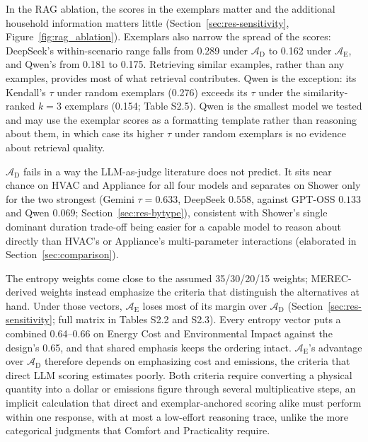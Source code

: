 \documentclass[final,3p,times]{elsarticle}
\begin{document}
In the RAG ablation, the scores in the exemplars matter and the additional household information matters little (Section~\ref{sec:res-sensitivity}, Figure~\ref{fig:rag_ablation}). Exemplars also narrow the spread of the scores: DeepSeek's within-scenario range falls from 0.289 under $\mathcal{A}_{\text{D}}$ to 0.162 under $\mathcal{A}_{\text{E}}$, and Qwen's from 0.181 to 0.175. Retrieving similar examples, rather than any examples, provides most of what retrieval contributes. Qwen is the exception: its Kendall's $\tau$ under random exemplars (0.276) exceeds its $\tau$ under the similarity-ranked $k=3$ exemplars (0.154; Table S2.5). Qwen is the smallest model we tested and may use the exemplar scores as a formatting template rather than reasoning about them, in which case its higher $\tau$ under random exemplars is no evidence about retrieval quality.

$\mathcal{A}_{\text{D}}$ fails in a way the LLM-as-judge literature does not predict. It sits near chance on HVAC and Appliance for all four models and separates on Shower only for the two strongest (Gemini $\tau = 0.633$, DeepSeek $0.558$, against GPT-OSS $0.133$ and Qwen $0.069$; Section~\ref{sec:res-bytype}), consistent with Shower's single dominant duration trade-off being easier for a capable model to reason about directly than HVAC's or Appliance's multi-parameter interactions (elaborated in Section~\ref{sec:comparison}).

The entropy weights come close to the assumed 35/30/20/15 weights; MEREC-derived weights instead emphasize the criteria that distinguish the alternatives at hand. Under those vectors, $\mathcal{A}_{\text{E}}$ loses most of its margin over $\mathcal{A}_{\text{D}}$ (Section~\ref{sec:res-sensitivity}; full matrix in Tables S2.2 and S2.3). Every entropy vector puts a combined 0.64--0.66 on Energy Cost and Environmental Impact against the design's 0.65, and that shared emphasis keeps the ordering intact. $\mathcal{A}_{\text{E}}$'s advantage over $\mathcal{A}_{\text{D}}$ therefore depends on emphasizing cost and emissions, the criteria that direct LLM scoring estimates poorly. Both criteria require converting a physical quantity into a dollar or emissions figure through several multiplicative steps, an implicit calculation that direct and exemplar-anchored scoring alike must perform within one response, with at most a low-effort reasoning trace, unlike the more categorical judgments that Comfort and Practicality require.
\end{document}
